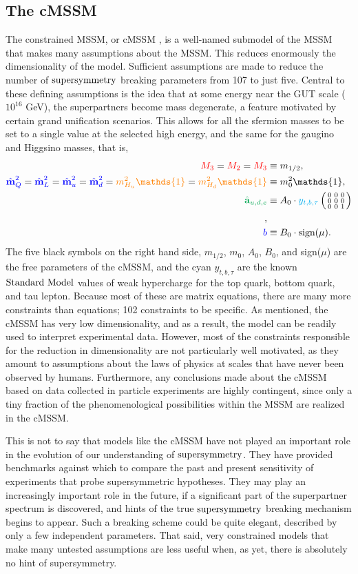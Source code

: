 \subsection{The cMSSM}
The constrained MSSM, or cMSSM \cite{Wess:1984jr}, is a well-named submodel of the MSSM that makes many assumptions about the MSSM. This reduces enormously the dimensionality of the model. Sufficient assumptions are made to reduce the number of $\text{supersymmetry}$ breaking parameters from 107 to just five. Central to these defining assumptions is the idea that at some energy near the GUT scale ($10^{16}$ GeV), the superpartners become mass degenerate, a feature motivated by certain grand unification scenarios. This allows for all the sfermion masses to be set to a single value at the selected high energy, and the same for the gaugino and Higgsino masses, that is,
\begin{align}
{\color{red}M_3}={\color{red}M_2}={\color{red}M_3} & \equiv m_{1/2},\\
{\color{blue}\hat{\textbf{m}}_Q^2}={\color{blue}\hat{\textbf{m}}_L^2}={\color{blue}\hat{\textbf{m}}_u^2}={\color{blue}\hat{\textbf{m}}_d^2} ={\color{orange}m_{H_u}^2\mathds{1}}={\color{orange}m_{H_d}^2\mathds{1}}& \equiv m_0^2\mathds{1},\\
{\color{Green}\hat{\textbf{a}}_{u,d,e}} & \equiv A_0\cdot{\color{cyan}y_{t,b,\tau}} \eightZeroMat,\\
{\color{blue}b} & \equiv B_0\cdot \text{sign}(\mu).
\end{align}
The five black symbols on the right hand side, $m_{1/2}$, $m_0$, $A_0$, $B_0$, and sign($\mu$) are the
free parameters of the cMSSM, and the cyan $y_{t,b,\tau}$ are the known $\text{Standard\ Model}$ values of weak hypercharge for the top quark, bottom quark, and tau lepton. Because most of these are matrix equations, there are many more constraints than equations; 102 constraints to be specific. As mentioned, the cMSSM has very low dimensionality, and as a result, the model can be readily used to interpret experimental data. However, most of the constraints responsible for the reduction in dimensionality are not particularly well motivated, as they amount to assumptions about the laws of physics at scales that have never been observed by humans. Furthermore, any conclusions made about the cMSSM based on data collected in particle experiments are highly contingent, since only a tiny fraction of the phenomenological possibilities within the MSSM are realized in the cMSSM.

This is not to say that models like the cMSSM have not played an important role in the evolution of our understanding of $\text{supersymmetry}$. They have provided benchmarks against which to compare the past and present sensitivity of experiments that probe supersymmetric hypotheses. They may play an increasingly important role in the future, if a significant part of the superpartner spectrum is discovered, and hints of the true $\text{supersymmetry}$ breaking mechanism begins to appear. Such a breaking scheme could be quite elegant, described by only a few independent parameters. That said, very constrained models that make many untested assumptions are less useful when, as yet, there is absolutely no hint of supersymmetry.

